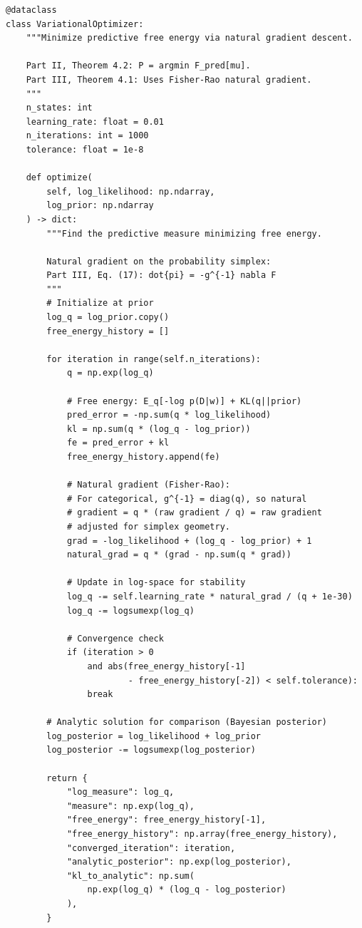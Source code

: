 \documentclass[12pt,a4paper]{article}
\theoremstyle{definition}
\begin{document}
\begin{lstlisting}[caption={Variational Optimizer --- Free energy minimization (Part~II, Thm.~4.2)},label=lst:variational]
@dataclass
class VariationalOptimizer:
    """Minimize predictive free energy via natural gradient descent.
    
    Part II, Theorem 4.2: P = argmin F_pred[mu].
    Part III, Theorem 4.1: Uses Fisher-Rao natural gradient.
    """
    n_states: int
    learning_rate: float = 0.01
    n_iterations: int = 1000
    tolerance: float = 1e-8
    
    def optimize(
        self, log_likelihood: np.ndarray,
        log_prior: np.ndarray
    ) -> dict:
        """Find the predictive measure minimizing free energy.
        
        Natural gradient on the probability simplex:
        Part III, Eq. (17): dot{pi} = -g^{-1} nabla F
        """
        # Initialize at prior
        log_q = log_prior.copy()
        free_energy_history = []
        
        for iteration in range(self.n_iterations):
            q = np.exp(log_q)
            
            # Free energy: E_q[-log p(D|w)] + KL(q||prior)
            pred_error = -np.sum(q * log_likelihood)
            kl = np.sum(q * (log_q - log_prior))
            fe = pred_error + kl
            free_energy_history.append(fe)
            
            # Natural gradient (Fisher-Rao):
            # For categorical, g^{-1} = diag(q), so natural
            # gradient = q * (raw gradient / q) = raw gradient
            # adjusted for simplex geometry.
            grad = -log_likelihood + (log_q - log_prior) + 1
            natural_grad = q * (grad - np.sum(q * grad))
            
            # Update in log-space for stability
            log_q -= self.learning_rate * natural_grad / (q + 1e-30)
            log_q -= logsumexp(log_q)
            
            # Convergence check
            if (iteration > 0
                and abs(free_energy_history[-1]
                        - free_energy_history[-2]) < self.tolerance):
                break
        
        # Analytic solution for comparison (Bayesian posterior)
        log_posterior = log_likelihood + log_prior
        log_posterior -= logsumexp(log_posterior)
        
        return {
            "log_measure": log_q,
            "measure": np.exp(log_q),
            "free_energy": free_energy_history[-1],
            "free_energy_history": np.array(free_energy_history),
            "converged_iteration": iteration,
            "analytic_posterior": np.exp(log_posterior),
            "kl_to_analytic": np.sum(
                np.exp(log_q) * (log_q - log_posterior)
            ),
        }
\end{lstlisting}
\end{document}
